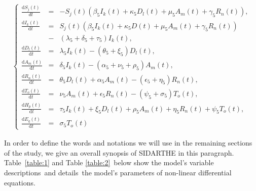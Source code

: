 \documentclass{article}
\begin{document}

\begin{eqnarray}
\left\{\begin{array}{lcl}
\displaystyle{\frac{\text{d}S_j(t)}{dt}}&=& -S_j(t)(\beta_5 I_k(t) +\kappa_5 D_l(t) +\mu_5 A_m(t)+\gamma_5 R_n(t)),\\
 \frac{\text{d}I_k(t)}{\text{d}t} &=& S_j(t)(\beta_5 I_k(t) +\kappa_5 D(t)+\mu_5 A_m(t)+\gamma_5 R_n(t))\\
                                  &-&(\lambda_5 +\delta_5 + \tau_5)I_k(t),\\
\frac{\text{d}D_l(t)}{\text{d}t} &=&\lambda_5 I_k(t) -(\theta_5 + \xi_5)D_l(t), \\ 
\frac{\text{d}A_m(t)}{\text{d}t} &=& \delta_5 I_k(t) -(\alpha_5 + \nu_5 + \rho_5)A_m(t),\\
\frac{\text{d}R_n(t)}{\text{d}t} &=& \theta_5 D_l(t) + \alpha_5 A_m(t) -(\epsilon_5 + \eta_5)R_n(t),\\
\frac{\text{d}T_o(t)}{\text{d}t} &=& \nu_5 A_m(t) +\epsilon_5 R_n(t) - (\psi_5 + \sigma_5)T_o(t),\\
\frac{\text{d}H_p(t)}{\text{d}t} &=& \tau_5 I_k(t) + \xi_5 D_l(t) + \rho_5 A_m(t) + \eta_5 R_n(t) + \psi_5 T_o(t),\\
\frac{\text{d}E_q(t)}{\text{d}t} &=& \sigma_5 T_o(t) 
\label{EQ01} 
 \end{array}\right.
\end{eqnarray}

\noindent In order to define the words and notations we will use in the remaining sections of the study, we give an overall synopsis of SIDARTHE \citep{giordano2020modelling} in this paragraph.\\
Table \ref{table:1} and Table \ref{table:2} below show the model's variable descriptions and details the model's parameters of non-linear differential equations.\\
\end{document}
